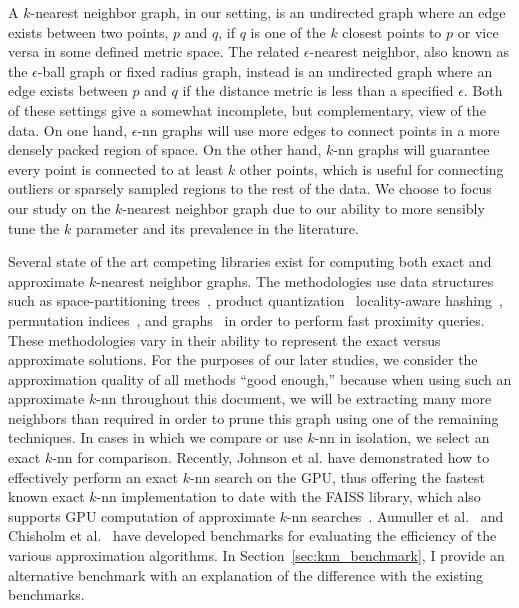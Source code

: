 A $k$-nearest neighbor graph, in our setting, is an undirected graph where an edge exists between two points, $p$ and $q$, if $q$ is one of the $k$ closest points to $p$ or vice versa in some defined metric space.
%
The related $\epsilon$-nearest neighbor, also known as the $\epsilon$-ball graph or fixed radius graph, instead is an undirected graph where an edge exists between $p$ and $q$ if the distance metric is less than a specified $\epsilon$.
%
Both of these settings give a somewhat incomplete, but complementary, view of the data.
%
On one hand, $\epsilon$-nn graphs will use more edges to connect points in a more densely packed region of space.
%
On the other hand, $k$-nn graphs will guarantee every point is connected to at least $k$ other points, which is useful for connecting outliers or sparsely sampled regions to the rest of the data.
%
We choose to focus our study on the $k$-nearest neighbor graph due to our ability to more sensibly tune the $k$ parameter and its prevalence in the literature.

Several state of the art competing libraries exist for computing both exact and approximate $k$-nearest neighbor graphs.
%
The methodologies use data structures such as space-partitioning trees~\cite{Bentley1975,LiuMooreGray2004,Omohundro1989,Uhlmann1991,Yianilos1993}, product quantization~\cite{BabenkoLempitsky2012,JegouDouzeSchmid2011} locality-aware hashing~\cite{BawaCondieGanesan2005,LvJosephsonWang2007,AndoniIndyk2008,TsaiYang2014,ZhaoLuMei2014}, permutation indices~\cite{Esuli2012,TellezChavezNavarro2013}, and graphs~\cite{AryaMount1993,DongMosesLi2011,HouleSakuma2005,IwasakiMiyazaki2018,MalkovYashunin2018,SebastianKimia2002,WangLi2012} in order to perform fast proximity queries.
%
These methodologies vary in their ability to represent the exact versus approximate solutions.
%
For the purposes of our later studies, we consider the approximation quality of all methods ``good enough,'' because when using such an approximate $k$-nn throughout this document, we will be extracting many more neighbors than required in order to prune this graph using one of the remaining techniques.
%
In cases in which we compare or use $k$-nn in isolation, we select an exact $k$-nn for comparison.
%
Recently, Johnson et al. have demonstrated how to effectively perform an exact $k$-nn search on the GPU, thus offering the fastest known exact $k$-nn implementation to date with the FAISS library, which also supports GPU computation of approximate $k$-nn searches~\cite{JohnsonDouzeJegou2017}.
%
Aumuller et al.~\cite{AumullerBernhardssonFaithfull2017} and Chisholm et al.~\cite{ChisholmRichmondMaddock2016} have developed benchmarks for evaluating the efficiency of the various approximation algorithms.
%
In Section~\ref{sec:knn_benchmark}, I provide an alternative benchmark with an explanation of the difference with the existing benchmarks.

